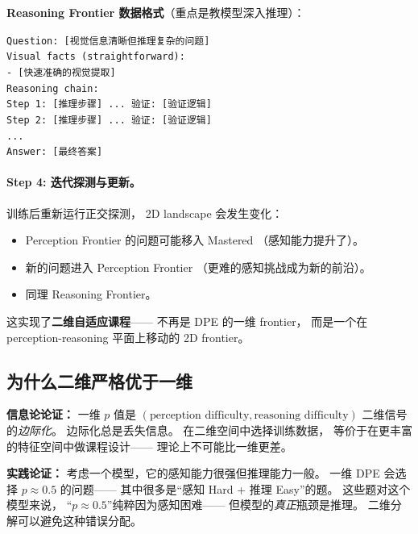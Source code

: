 \documentclass[12pt,a4paper]{article}
\begin{document}
\textbf{Reasoning Frontier 数据格式}（重点是教模型深入推理）：
\begin{tcolorbox}[colback=gray!5,colframe=gray!50,boxrule=0.3pt,left=4pt,right=4pt]
\small
\texttt{Question: [视觉信息清晰但推理复杂的问题]}\\[2pt]
\texttt{Visual facts (straightforward):}\\
\texttt{- [快速准确的视觉提取]}\\[2pt]
\texttt{Reasoning chain:}\\
\texttt{Step 1: [推理步骤] ... 验证: [验证逻辑]}\\
\texttt{Step 2: [推理步骤] ... 验证: [验证逻辑]}\\
\texttt{...}\\
\texttt{Answer: [最终答案]}
\end{tcolorbox}

\paragraph{Step 4: 迭代探测与更新。}

训练后重新运行正交探测，
2D landscape 会发生变化：
\begin{itemize}[leftmargin=2em]
  \item Perception Frontier 的问题可能移入 Mastered
    （感知能力提升了）。
  \item 新的问题进入 Perception Frontier
    （更难的感知挑战成为新的前沿）。
  \item 同理 Reasoning Frontier。
\end{itemize}

\noindent
这实现了\textbf{二维自适应课程}——
不再是 DPE 的一维 frontier，
而是一个在 perception-reasoning 平面上移动的 2D frontier。

\subsection{为什么二维严格优于一维}

\textbf{信息论论证：}
一维 $p$ 值是 $(\text{perception difficulty}, \text{reasoning difficulty})$
二维信号的\textit{边际化}。
边际化总是丢失信息。
在二维空间中选择训练数据，
等价于在更丰富的特征空间中做课程设计——
理论上不可能比一维更差。

\textbf{实践论证：}
考虑一个模型，它的感知能力很强但推理能力一般。
一维 DPE 会选择 $p \approx 0.5$ 的问题——
其中很多是``感知 Hard + 推理 Easy''的题。
这些题对这个模型来说，
``$p \approx 0.5$''纯粹因为感知困难——
但模型的\textit{真正}瓶颈是推理。
二维分解可以避免这种错误分配。
\end{document}
